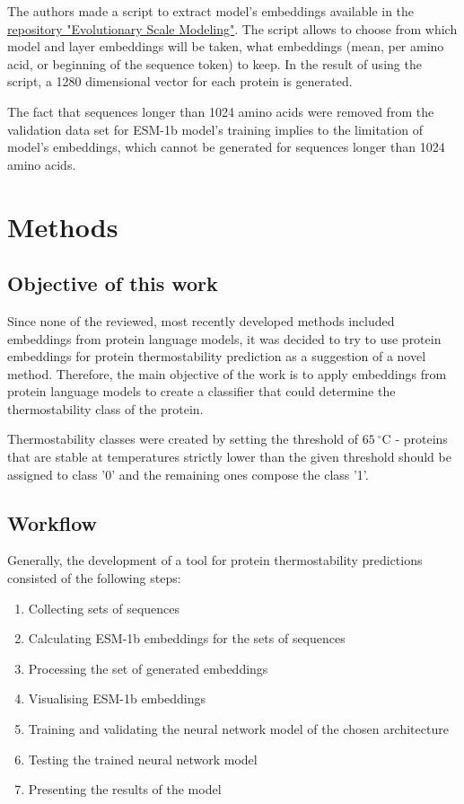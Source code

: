 \documentclass[12pt]{article}
\begin{document}
	The authors made a script to extract model's embeddings available in the 
	\href{https://github.com/facebookresearch/esm}{repository "Evolutionary Scale Modeling"}.
	The script allows to choose 
	from which model and layer embeddings will be taken, what embeddings 
	(mean, per amino acid, or beginning of the sequence token) to keep. In the
	result of using the script, a 1280 dimensional vector for each protein is 
	generated.
	
	The fact that sequences longer than 1024 amino acids were removed from the 
	validation data set for ESM-1b model's training implies to the limitation of 
	model's embeddings, which cannot be generated for sequences longer than 
	1024 amino acids.

	\newpage

	\section{Methods}

	\subsection{Objective of this work}

	Since none of the reviewed, most recently developed methods included 
	embeddings from protein language models, it was decided to try to use 
	protein embeddings for protein thermostability prediction as a 
	suggestion of a novel method. Therefore, the main objective of the 
	work is to apply embeddings from protein language models to create a 
	classifier that could determine the thermostability class of the protein.

	Thermostability classes were created by setting the threshold of 
	$65\ ^\circ$C - proteins that are stable at temperatures strictly lower 
	than the given threshold should be assigned to class '0' and the 
	remaining ones compose the class '1'. 

	\subsection{Workflow}

	Generally, the development of a tool for protein thermostability predictions
	consisted of the following steps:

	\begin{enumerate}
		\item Collecting sets of sequences
		\item Calculating ESM-1b embeddings for the sets of sequences
		\item Processing the set of generated embeddings
		\item Visualising ESM-1b embeddings
		\item Training and validating the neural network model of the chosen architecture 
		\item Testing the trained neural network model
		\item Presenting the results of the model
	\end{enumerate}
\end{document}
